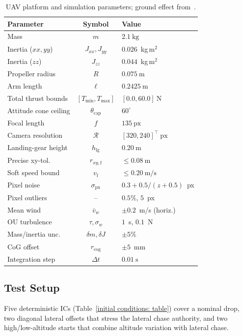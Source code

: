 \documentclass{IEEEtaes}
\begin{document}
\begin{table}[!t]
\centering
\caption{UAV platform and simulation parameters; ground effect from~\cite{sanchez-cuevas2017}.}
\label{uav params: table}
\begin{tabular}{lcl}
\toprule
\textbf{Parameter} & \textbf{Symbol} & \textbf{Value} \\
\midrule
Mass                & $m$                    & $2.1~\text{kg}$ \\
Inertia ($xx,yy$)    & $J_{xx},J_{yy}$        & $0.026$~kg\,m$^2$ \\
Inertia ($zz$)        & $J_{zz}$               & $0.044$~kg\,m$^2$ \\
Propeller radius    & $R$                    & $0.075~\text{m}$ \\
Arm length          & $\ell$                 & $0.2425~\text{m}$ \\
Total thrust bounds & $[T_{\min},T_{\max}]$  & $[0.0,60.0]~\text{N}$ \\
Attitude cone ceiling & $\theta_\text{cap}$   & $60^\circ$ \\
Focal length        & $f$                    & $135~\text{px}$ \\
Camera resolution   & $\mathcal{R}$          & $[320,240]^\top~\text{px}$ \\
Landing-gear height & $h_\text{lg}$ & $0.20~\text{m}$ \\
Precise xy-tol.     & $r_{xy,\text{f}}$ & $\le 0.08~\text{m}$ \\
Soft speed bound    & $v_\text{f}$      & $\le 0.20~\text{m/s}$ \\
Pixel noise          & $\sigma_\text{px}$     & $0.3{+}0.5/(z{+}0.5)$~px \\
Pixel outliers       & --                     & $0.5\%$, $5$~px \\
Mean wind            & $\bar{v}_w$            & $\pm 0.2$~m/s (horiz.) \\
OU turbulence        & $\tau,\sigma_w$        & $1$~s, $0.1$~N \\
Mass/inertia unc.    & $\delta m,\delta J$    & $\pm 5\%$ \\
CoG offset           & $r_\text{cog}$         & $\pm 5$~mm \\
Integration step    & $\Delta t$             & $0.01~\text{s}$ \\
\bottomrule
\end{tabular}
\end{table}

\subsection{Test Setup}
\label{test conditions: subsec}
Five deterministic ICs (Table~\ref{initial conditions: table}) cover a nominal drop, two diagonal lateral offsets that stress the lateral chase authority, and two high/low-altitude starts that combine altitude variation with lateral chase.
\end{document}
